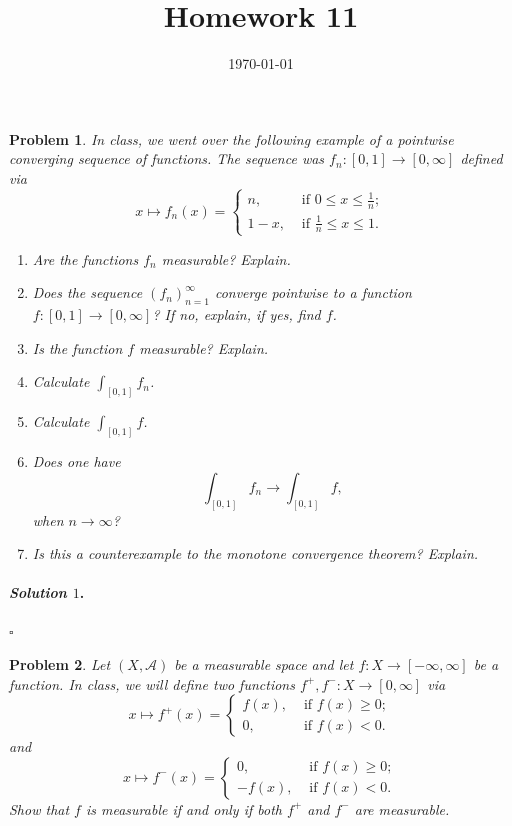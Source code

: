 \documentclass[reqno]{amsart}
\theoremstyle{plain}
\newtheorem{problem}{Problem}
\theoremstyle{definition}
\newenvironment{solution1}{\paragraph{\emph{Solution $1$}.}}{\hfill$\square$}
\begin{document}
 

\title[Homework 11]{Homework 11}

\date{\today} 
\maketitle 






\begin{problem}
In class, we went over the following example of a pointwise converging sequence of functions.  The sequence was $f_{n}:[0,1] \rightarrow [0,\infty]$ defined via
\begin{equation*}
x \mapsto f_{n}(x) = 
\begin{cases}
n,& \text{ if } 0 \le x \le \frac{1}{n} ; \\
1-x, & \text{ if } \frac{1}{n} \le x \le 1.
\end{cases}
\end{equation*}
\begin{enumerate}
\item Are the functions $f_{n}$ measurable?  Explain.
\item Does the sequence $(f_{n})_{n=1}^{\infty}$ converge pointwise to a function $f:[0,1] \rightarrow [0,\infty]$?  If no, explain, if yes, find $f$.
\item Is the function $f$ measurable?  Explain.
\item Calculate $\int_{[0,1]}f_{n}$.
\item Calculate $\int_{[0,1]}f$.
\item Does one have
$$\int_{[0,1]}f_{n} \rightarrow \int_{[0,1]}f, $$
when $n \to \infty$?
\item Is this a counterexample to the monotone convergence theorem?  Explain.
\end{enumerate}
\end{problem}
\begin{solution1}

\end{solution1}


\begin{problem}
Let $(X,\mathcal{A})$ be a measurable space and let $f:X \rightarrow [-\infty,\infty]$ be a function.  In class, we will define two functions $f^{+},f^{-}:X \rightarrow [0,\infty]$ via
\begin{equation*}
x \mapsto f^{+}(x) = 
\begin{cases}
f(x), & \text{ if } f(x) \ge 0;\\
0, & \text{ if } f(x) < 0.
\end{cases}
\end{equation*}
and 
\begin{equation*}
x \mapsto f^{-}(x) = 
\begin{cases}
0, & \text{ if } f(x) \ge 0;\\
-f(x), & \text{ if } f(x) < 0.
\end{cases}
\end{equation*}
Show that $f$ is measurable if and only if both $f^{+}$ and $f^{-}$ are measurable.
\end{problem}
\end{document}
